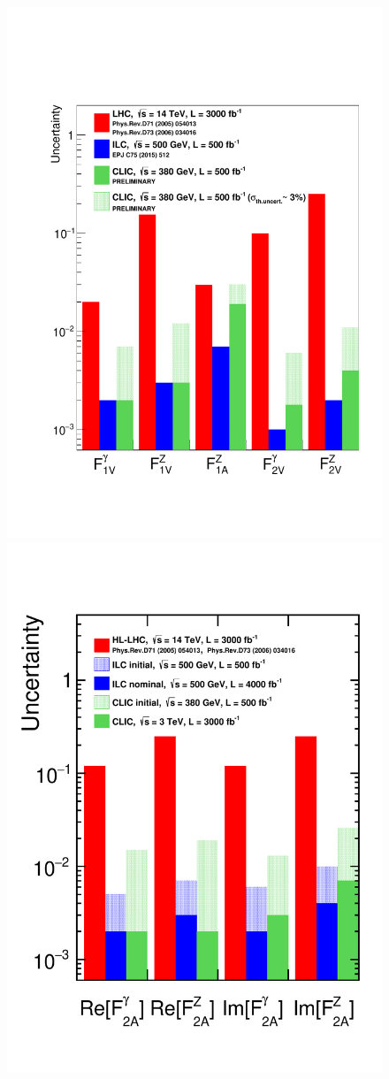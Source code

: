 \begin{figure}[tb]
 \begin{center}
 \includegraphics[width=0.8\hsize]{chapters/figures/top_ew_couplings_cpc.pdf}
 \includegraphics[width=0.8\hsize]{chapters/figures/top_ew_couplings_cpv.pdf}

\end{center}
\end{figure}
